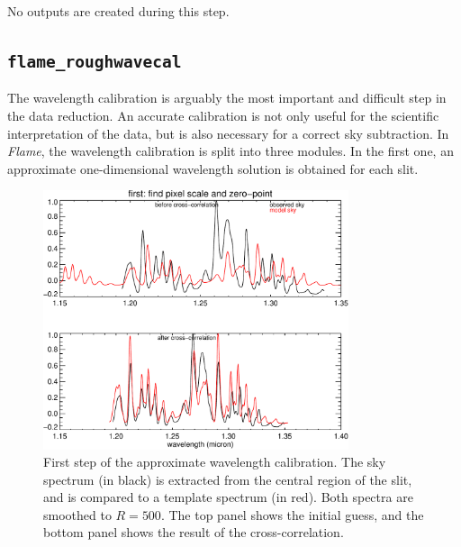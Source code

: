 \documentclass[a4paper]{article}
\newcommand{\flame}{\emph{Flame}}
\begin{document}
\begin{sloppypar}
\medskip
\noindent
No outputs are created during this step.


\subsection{\texttt{flame\_roughwavecal}}
\label{sec:roughwavecal}

The wavelength calibration is arguably the most important and difficult step in the data reduction. An accurate calibration is not only useful for the scientific interpretation of the data, but is also necessary for a correct sky subtraction. In \flame, the wavelength calibration is split into three modules. In the first one, an approximate one-dimensional wavelength solution is obtained for each slit.

\begin{figure}[tbp]
  \centering
 \includegraphics[width=0.80\textwidth]{wavecal1}
\caption{First step of the approximate wavelength calibration. The sky spectrum (in black) is extracted from the central region of the slit, and is compared to a template spectrum (in red). Both spectra are smoothed to $R=500$. The top panel shows the initial guess, and the bottom panel shows the result of the cross-correlation.}
\label{fig:wavecal_approx}
\end{figure}


\end{sloppypar}
\end{document}
